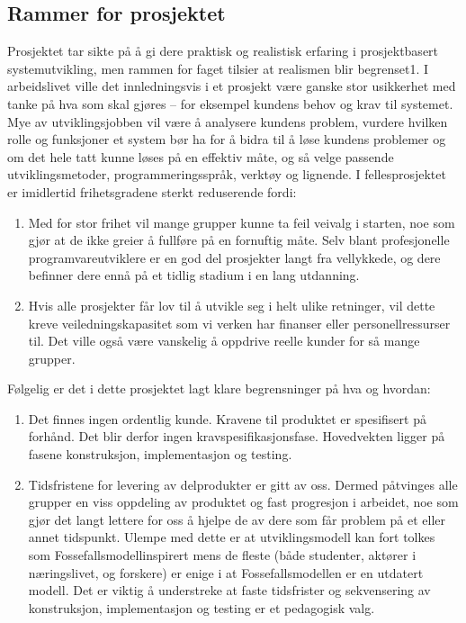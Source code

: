 \subsection{Rammer for prosjektet}

Prosjektet tar sikte på å gi dere praktisk og realistisk erfaring i prosjektbasert systemutvikling, men rammen for faget tilsier at realismen blir begrenset1.
I arbeidslivet ville det innledningsvis i et prosjekt være ganske stor usikkerhet med tanke på hva som skal gjøres – for eksempel kundens behov og krav til systemet. Mye av utviklingsjobben vil være å analysere kundens problem, vurdere hvilken rolle og funksjoner et system bør ha for å bidra til å løse kundens problemer og om det hele tatt kunne løses på en effektiv måte, og så velge passende utviklingsmetoder, programmeringsspråk, verktøy og lignende. I fellesprosjektet er imidlertid frihetsgradene sterkt reduserende fordi:

\begin{enumerate}
\item
Med for stor frihet vil mange grupper kunne ta feil veivalg i starten, noe som gjør at de ikke greier å fullføre på en fornuftig måte. Selv blant profesjonelle programvareutviklere er en god del prosjekter langt fra vellykkede, og dere befinner dere ennå på et tidlig stadium i en lang utdanning.

\item
Hvis alle prosjekter får lov til å utvikle seg i helt ulike retninger, vil dette kreve veiledningskapasitet som vi verken har finanser eller personellressurser til. Det ville også være vanskelig å oppdrive reelle kunder for så mange grupper.

\end{enumerate}

Følgelig er det i dette prosjektet lagt klare begrensninger på hva og hvordan:

\begin{enumerate}
\item
Det finnes ingen ordentlig kunde. Kravene til produktet er spesifisert på forhånd. Det blir derfor ingen kravspesifikasjonsfase. Hovedvekten ligger på fasene konstruksjon, implementasjon og testing.

\item
Tidsfristene for levering av delprodukter er gitt av oss. Dermed påtvinges alle grupper en viss oppdeling av produktet og fast progresjon i arbeidet, noe som gjør det langt lettere for oss å hjelpe de av dere som får problem på et eller annet tidspunkt. Ulempe med dette er at utviklingsmodell kan fort tolkes som Fossefallsmodellinspirert mens de fleste (både studenter, aktører i næringslivet, og forskere) er enige i at Fossefallsmodellen er en utdatert modell. Det er viktig å understreke at faste tidsfrister og sekvensering av konstruksjon, implementasjon og testing er et pedagogisk valg.

\end{enumerate}

